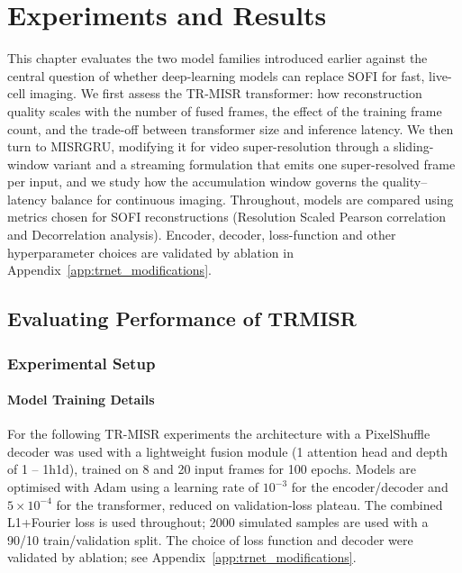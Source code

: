 \chapter{Experiments and Results}
\label{ch:results}

This chapter evaluates the two model families introduced earlier against the central
question of whether deep-learning models can replace SOFI for fast, live-cell imaging.
We first assess the TR-MISR transformer: how reconstruction quality scales with the number
of fused frames, the effect of the training frame count, and the trade-off between
transformer size and inference latency. We then turn to MISRGRU, modifying it for video
super-resolution through a sliding-window variant and a streaming formulation that emits one
super-resolved frame per input, and we study how the accumulation window governs the
quality–latency balance for continuous imaging. Throughout, models are compared using
metrics chosen for SOFI reconstructions (Resolution Scaled Pearson correlation and Decorrelation 
analysis). Encoder, decoder, loss-function and other hyperparameter choices are validated by
ablation in Appendix~\ref{app:trnet_modifications}.

\section{Evaluating Performance of TRMISR}
\label{sec:arch_compare}

\subsection{Experimental Setup}
\label{ssec:experimental_setup}

\subsubsection{Model Training Details}
For the following TR-MISR experiments the architecture with a PixelShuffle decoder was used
with a lightweight fusion module (1 attention head and depth of 1 -- 1h1d),
trained on 8 and 20 input frames for 100 epochs.
Models are optimised with Adam using a learning rate of $10^{-3}$ for the encoder/decoder
and $5 \times 10^{-4}$ for the transformer, reduced on validation-loss plateau.
The combined L1+Fourier loss is used throughout; 2000 simulated samples are used with a
90/10 train/validation split. The choice of loss function and decoder were
validated by ablation; see Appendix~\ref{app:trnet_modifications}.

